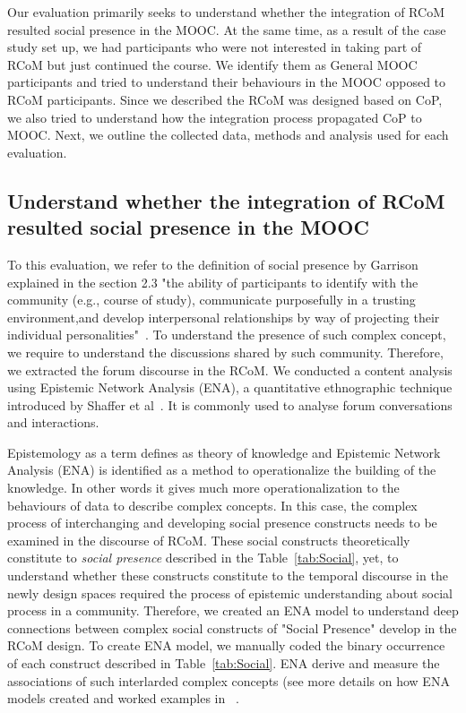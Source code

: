 \documentclass[format=acmsmall, review=false, screen=true]{acmart}
\newcommand{\dil}[1]{{\textcolor{magenta}{ Dilrukshi: #1]}}}
\begin{document}
Our evaluation primarily seeks to understand whether the integration of RCoM resulted social presence in the MOOC. At the same time, as a result of the case study set up, we had participants who were not interested in taking part of RCoM but just continued the course. We identify them as General MOOC participants and tried to understand their behaviours in the MOOC opposed to RCoM participants. Since we described the RCoM was designed based on CoP,  we also tried to understand how the integration process propagated CoP to MOOC. Next, we outline the collected data, methods and analysis used for each evaluation. 



\subsection{Understand whether the integration of RCoM resulted social presence in the MOOC}
To this evaluation, we refer to the definition of social presence by Garrison explained in the section 2.3 "the ability of participants to identify with the community (e.g., course of study), communicate purposefully in a trusting environment,and develop interpersonal relationships by way of projecting their individual personalities"~\cite{garrison2009communities}. To understand the presence of such complex concept, we require to understand the discussions shared by such community. Therefore, we extracted the forum discourse in the RCoM. We conducted a content analysis using Epistemic Network Analysis (ENA), a quantitative ethnographic technique introduced by Shaffer et al~\cite{shaffer2009epistemic}. It is commonly used to analyse forum conversations and interactions. 

Epistemology as a term defines as theory of knowledge and Epistemic Network Analysis (ENA) is identified as a method to operationalize the building of the knowledge. In other words it gives much more operationalization to the behaviours of data to describe complex concepts. In this case, the complex process of interchanging and developing social presence constructs needs to be examined in the discourse of RCoM. These social constructs theoretically constitute to \textit{social presence} described in the Table~\ref{tab:Social}, yet, to understand whether these constructs constitute to the temporal discourse in the newly design spaces required the process of epistemic understanding about social process in a community. Therefore, we created an ENA model to understand deep connections between complex social constructs of "Social Presence" develop in the RCoM design. To create ENA model, we manually coded the binary occurrence of each construct described in Table~\ref{tab:Social}. ENA derive and measure the associations of such interlarded complex concepts (see more details on how ENA models created and worked examples in ~\cite{shaffer2017quantitative, shaffer2009epistemic, rupp2010evidence}. 
\end{document}
